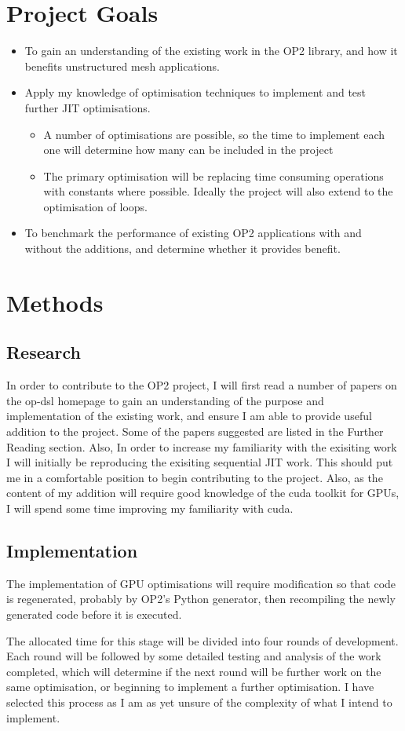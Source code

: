 \documentclass[11pt]{article}
\begin{document}
\section*{Project Goals}
 \begin{itemize}
  \item{To gain an understanding of the existing work in the OP2 library, and how it benefits unstructured mesh applications.}
  \item{Apply my knowledge of optimisation techniques to implement and test further JIT optimisations.}\
\begin{itemize}
\item{A number of optimisations are possible, so the time to implement each one will determine how many can be included in the project}
\item{The primary optimisation will be replacing time consuming operations with constants where possible. Ideally the project will also extend to the optimisation of loops.}
\end{itemize}  
\item{To benchmark the performance of existing OP2 applications with and without the additions, and determine whether it provides benefit.}
 \end{itemize}
\section*{Methods}
\subsection*{Research}
In order to contribute to the OP2 project, I will first read a number of papers on the op-dsl homepage to gain an understanding of the purpose and implementation of the existing work, and ensure I am able to provide useful addition to the project. Some of the papers suggested are listed in the Further Reading section. Also, In order to increase my familiarity with the exisiting work I will initially be reproducing the exisiting sequential JIT work. This should put me in a comfortable position to begin contributing to the project.
Also, as the content of my addition will require good knowledge of the cuda toolkit for GPUs, I will spend some time improving my familiarity with cuda.
\subsection*{Implementation}
The implementation of GPU optimisations will require modification so that code is regenerated, probably by OP2's Python generator, then recompiling the newly generated code before it is executed.\par
The allocated time for this stage will be divided into four rounds of development. Each round will be followed by some detailed testing and analysis of the work completed, which will determine if the next round will be further work on the same optimisation, or beginning to implement a further optimisation. I have selected this process as I am as yet unsure of the complexity of what I intend to implement.
\end{document}
